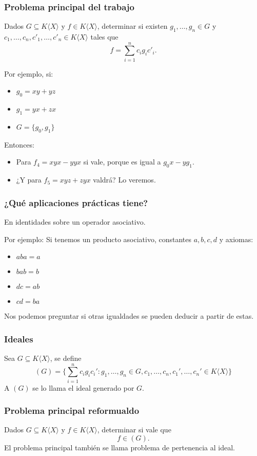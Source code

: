 \documentclass[spanish, aspectratio=169, hidecontrols]{beamer}
\begin{document}
\begin{frame}
  \frametitle{Problema principal del trabajo}
  Dados $G ⊆ K⟨X⟩$ y $f ∈ K⟨X⟩$, determinar si existen $g_1, …, g_n ∈ G$ y $c_1, …, c_n, c'_1, …, c'_n ∈ K⟨X⟩$ tales que
  \[ f = ∑_{i = 1}^n c_i g_i c'_i \text{.}\]
  \pause
  \begin{exampleblock}{Por ejemplo, si:}
    \begin{itemize}
      \item $g_0 = xy + yz$
      \item $g_1 = yx + zx$
      \item $G = \{g_0, g_1\}$
    \end{itemize}
    Entonces:
    \begin{itemize}
      \item Para $f_4 = xyx - yyx$ si vale\pause, porque es igual a $g_0 x - y g_1$. %
      \pause
      \item ¿Y para $f_5 = xyz + zyx$ valdrá? \pause Lo veremos.
    \end{itemize}
  \end{exampleblock}

\end{frame}

\begin{frame}
  \frametitle{¿Qué aplicaciones prácticas tiene?}

  En identidades sobre un operador asociativo.
  \begin{exampleblock}{Por ejemplo:}
    Si tenemos un producto asociativo, constantes $a, b, c, d$ y axiomas:
    \begin{itemize}
      \item $aba = a$
      \item $bab = b$
      \item $dc = ab$
      \item $cd = ba$
    \end{itemize}
    Nos podemos preguntar si otras igualdades se pueden deducir a partir de estas.
  \end{exampleblock}
\end{frame}

\begin{frame}
  \frametitle{Ideales}
  \pause
  Sea $G ⊆ K⟨X⟩$, se define
  \[ (G) = \{∑_{i = 1}^n c_i g_i c_i' : g_1, …, g_n ∈ G, c_1, …, c_n, c_1', …, c_n' ∈ K⟨X⟩\} \]
  A $(G)$ se lo llama el ideal generado por $G$.
\end{frame}

\begin{frame}
  \frametitle{Problema principal reformualdo}
  Dados $G ⊆ K⟨X⟩$ y $f ∈ K⟨X⟩$, determinar si vale que
  \[ f ∈ (G) \text{.} \]
  \pause
  El problema principal también se llama problema de pertenencia al ideal.
\end{frame}
\end{document}
